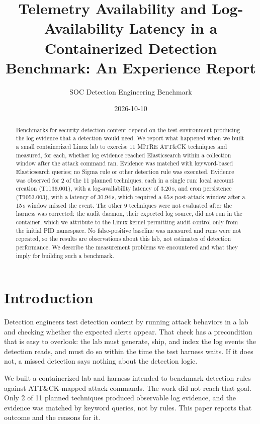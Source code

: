 \documentclass[11pt,a4paper]{article}
\title{Telemetry Availability and Log-Availability Latency in a Containerized
Detection Benchmark: An Experience Report}
\author{SOC Detection Engineering Benchmark} %
\date{2026-10-10}
\begin{document}
\maketitle

\begin{abstract}
Benchmarks for security detection content depend on the test environment
producing the log evidence that a detection would need. We report what happened
when we built a small containerized Linux lab to exercise 11 MITRE ATT\&CK
techniques and measured, for each, whether log evidence reached Elasticsearch
within a collection window after the attack command ran. Evidence was matched
with keyword-based Elasticsearch queries; no Sigma rule or other detection rule
was executed. Evidence was observed for 2 of the 11 planned techniques, each in
a single run: local account creation (T1136.001), with a log-availability
latency of 3.20\,s, and cron persistence (T1053.003), with a latency of
30.94\,s, which required a 65\,s post-attack window after a 15\,s window
missed the event. The other 9 techniques were not evaluated after the harness
was corrected: the audit daemon, their expected log source, did not run in the
container, which we attribute to the Linux kernel permitting audit control only
from the initial PID namespace. No false-positive baseline was measured
and runs were not repeated, so the results are observations about this lab, not
estimates of detection performance. We describe the measurement problems we
encountered and what they imply for building such a benchmark.
\end{abstract}

\section{Introduction}

Detection engineers test detection content by running attack behaviors in a
lab and checking whether the expected alerts appear. That check has a
precondition that is easy to overlook: the lab must generate, ship, and index
the log events the detection reads, and must do so within the time the test
harness waits. If it does not, a missed detection says nothing about the
detection logic.

We built a containerized lab and harness intended to benchmark detection rules
against ATT\&CK-mapped attack commands. The work did not reach that goal. Only
2 of 11 planned techniques produced observable log evidence, and the evidence
was matched by keyword queries, not by rules. This paper reports that outcome
and the reasons for it.
\end{document}
